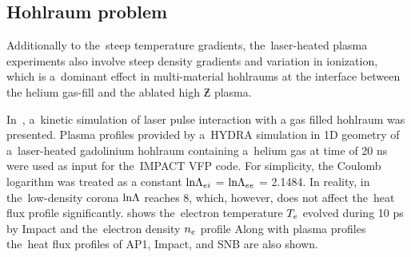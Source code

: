 
 %

\subsection{Hohlraum problem}
Additionally to the~steep temperature gradients, the~laser-heated plasma 
experiments also involve steep density gradients and variation in ionization,
which is a~dominant effect in multi-material hohlraums
at the interface between the helium gas-fill and 
the ablated high $\Zbar$ plasma.

In~\cite{Brodrick_PoP2017}, a~kinetic simulation of laser pulse interaction 
with a gas filled hohlraum was presented. 
Plasma profiles provided by a~HYDRA simulation in 1D
geometry of a~laser-heated gadolinium hohlraum containing a~helium 
gas at time of 20 ns were used as input for the~IMPACT 
\cite{Kingham_JCP2004} VFP code.  
For simplicity, the Coulomb logarithm was treated as a
constant $\text{ln}\Lambda_{ei}$ = $\text{ln}\Lambda_{ee}$ = 2.1484. In reality, in the~low-density 
corona $\text{ln}\Lambda$ reaches 8, which, however, does not affect the~heat flux profile 
significantly. 
 shows the~electron temperature $T_e$ 
evolved during 10 ps by Impact and the~electron density $n_e$ profile
Along with plasma profiles the~heat flux profiles
of AP1, Impact, and SNB are also shown. 

